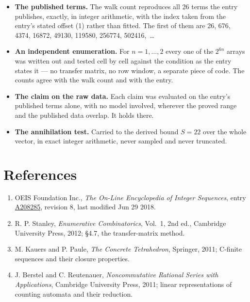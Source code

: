 \documentclass[11pt]{article}
\theoremstyle{definition}
\begin{document}
\begin{itemize}

\item {\bfseries The published terms.} The walk count reproduces all 26 terms the entry publishes, exactly, in integer arithmetic, with the index taken from the entry's stated offset (1) rather than fitted. The first of them are 26, 676, 4374, 16872, 49130, 119580, 256774, 502416,~\dots

\item {\bfseries An independent enumeration.} For $n = 1,\dots,2$ every one of the $2^{6n}$ arrays was written out and tested cell by cell against the condition as the entry states it --- no transfer matrix, no row window, a separate piece of code. The counts agree with the walk count and with the entry.

\item {\bfseries The claim on the raw data.} Each claim was evaluated on the entry's published terms alone, with no model involved, wherever the proved range and the published data overlap. It holds there.

\item {\bfseries The annihilation test.} Carried to the derived bound $S = 22$ over the whole vector, in exact integer arithmetic, never sampled and never truncated.

\end{itemize}

\section{References}

\begin{enumerate}

\item OEIS Foundation Inc., \emph{The On-Line Encyclopedia of Integer Sequences}, entry \href{https://oeis.org/A208285}{A208285}, revision 8, last modified Jun 29 2018.

\item R. P. Stanley, \emph{Enumerative Combinatorics}, Vol.~1, 2nd ed., Cambridge University Press, 2012; \S4.7, the transfer-matrix method.

\item M. Kauers and P. Paule, \emph{The Concrete Tetrahedron}, Springer, 2011; C-finite sequences and their closure properties.

\item J. Berstel and C. Reutenauer, \emph{Noncommutative Rational Series with Applications}, Cambridge University Press, 2011; linear representations of counting automata and their reduction.

\end{enumerate}
\end{document}
